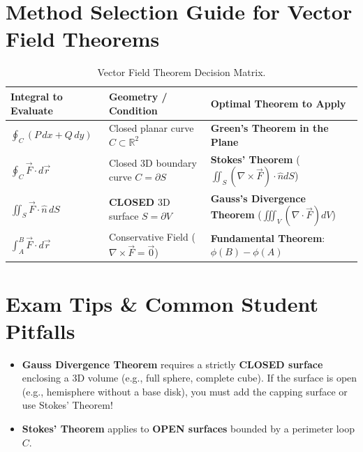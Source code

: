 \section{Method Selection Guide for Vector Field Theorems}

\begin{table}[htbp]
\centering
\small
\renewcommand{\arraystretch}{1.3}
\begin{tabularx}{\linewidth}{l>{\raggedright\arraybackslash}X>{\raggedright\arraybackslash}X}
\toprule
\textbf{Integral to Evaluate} & \textbf{Geometry / Condition} & \textbf{Optimal Theorem to Apply} \\
\midrule
$\oint_C (P\,dx + Q\,dy)$ & Closed planar curve $C \subset \mathbb{R}^2$ & \textbf{Green's Theorem in the Plane} \\
$\oint_C \vec{F} \cdot d\vec{r}$ & Closed 3D boundary curve $C = \partial S$ & \textbf{Stokes' Theorem} ($\iint_S (\nabla\times\vec{F})\cdot\hat{n} dS$) \\
$\iint_S \vec{F} \cdot \hat{n} \, dS$ & \textbf{CLOSED} 3D surface $S = \partial V$ & \textbf{Gauss's Divergence Theorem} ($\iiint_V (\nabla\cdot\vec{F}) dV$) \\
$\int_A^B \vec{F} \cdot d\vec{r}$ & Conservative Field ($\nabla\times\vec{F}=\vec{0}$) & \textbf{Fundamental Theorem}: $\phi(B) - \phi(A)$ \\
\bottomrule
\end{tabularx}
\caption{Vector Field Theorem Decision Matrix.}
\label{tab:vector-theorems-matrix}
\end{table}

\section{Exam Tips \& Common Student Pitfalls}

\begin{examtip}
\begin{itemize}
    \item \textbf{Gauss Divergence Theorem} requires a strictly \textbf{CLOSED surface} enclosing a 3D volume (e.g., full sphere, complete cube). If the surface is open (e.g., hemisphere without a base disk), you must add the capping surface or use Stokes' Theorem!
    \item \textbf{Stokes' Theorem} applies to \textbf{OPEN surfaces} bounded by a perimeter loop $C$.
\end{itemize}
\end{examtip}

